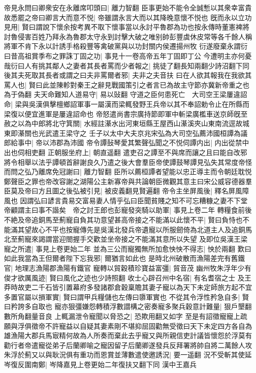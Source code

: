 帝見永問曰卿衆安在永離席叩頭曰|{
	離力智翻}
臣事更始不能令全誠慙以其衆幸富貴故悉罷之帝曰卿言大而意不悦|{
	帝雖謂永言大而以其降晚意懷不悦也}
旣而永以立功見用|{
	賢曰謂說下懷余按考異不取下懷事當以永討平魯郡為功也按永傳時董憲裨將討魯侵害百姓乃拜永為魯郡太守永到討擊大破之唯别帥彭豐虡休皮常等各千餘人稱將軍不肯下永以計誘手格殺豐等禽破黨與以功封關内侯遷揚州牧}
衍遂廢棄永謂衍曰昔高祖賞季布之罪誅丁固之功|{
	事見十一卷高帝五年丁固即丁公}
今遭明主亦何憂哉衍曰人有挑其鄰人之妻者其長者罵而少者報之|{
	挑徒了翻長知兩翻少詩沼翻下同}
後其夫死取其長者或謂之曰夫非罵爾者邪|{
	夫非之夫音扶}
曰在人欲其報我在我欲其罵人也|{
	賢曰此並陳軫對秦王之辭見戰國策引之者言已為故主守節亦冀新帝重之也為于偽翻}
夫天命難知人道易守|{
	易以䜴翻}
守道之臣何患死亡　大司空王梁屢違詔命|{
	梁與吳漢俱擊檀鄉詔軍事一屬漢而梁輒發野王兵帝以其不奉詔勅令止在所縣而梁復以便宜進軍是屢違詔命也}
帝怒遣尚書宗廣持節即軍中斬梁廣檻車送京師旣至赦之以為中郎將北守箕關|{
	水經註濝水出河東垣縣王屋西山濝溪夾山東南流逕故城東即濝關也光武遣王梁守之}
壬子以太中大夫京兆宋弘為大司空弘薦沛國桓譚為議郎給事中|{
	帝以沛郡為沛國}
帝令譚鼔琴愛其繁聲弘聞之不悦伺譚内出|{
	内出從禁中出也伺相吏翻}
正朝服坐府上|{
	朝直遥翻}
遣吏召之譚至不與席而讓之且曰能自改邪將令相舉以法乎譚頓首辭謝良久乃遣之後大會羣臣帝使譚鼓琴譚見弘失其常度帝怪而問之弘乃離席免冠謝曰|{
	離力智翻}
臣所以薦桓譚者望能以忠正導主而令朝廷耽悦鄭聲臣之罪也帝改容謝之湖陽公主新寡帝與共論朝臣微觀其意主曰宋公威容德器羣臣莫及帝曰方且圖之後弘被引見|{
	被皮義翻見賢遍翻}
帝令主坐屏風後|{
	釋名屏風障風也}
因謂弘曰諺言貴易交富易妻人情乎弘曰臣聞貧賤之知不可忘糟糠之妻不下堂帝顧謂主曰事不諧矣　帝之討王郎也彭寵發突騎以助軍|{
	事見上卷二年}
轉糧食前後不絶及帝追銅馬至薊寵自負其功意望甚高帝接之不能滿以此懷不平|{
	賢曰負恃也不能滿其望故心不平也按寵傳先是吳漢北發兵帝遺寵以所服劒倚為北道主人及追銅馬北至薊寵來謁謂當迎閤握手交歡並坐帝接之不能滿其意所以失望}
及即位吳漢王梁寵之所遣|{
	事見上卷更始二年}
並為三公而寵獨無所加愈怏怏不得志|{
	怏於兩翻}
歎曰如此我當為王但爾者陛下忘我邪|{
	爾猶言如此也}
是時北州破散而漁陽差完有舊鐵官|{
	地理志漁陽郡漁陽有鐵官}
寵轉以貿穀積珍寶益富彊|{
	貿音茂}
幽州牧朱浮年少有俊才欲厲風迹|{
	賢曰風化之迹也少詩照翻}
收士心辟召州中名宿|{
	有名耆宿之士}
及王莽時故吏二千石皆引置幕府多發諸郡倉穀稟贍其妻子寵以為天下未定師旅方起不宜多置官屬以損軍實|{
	賢曰謂甲兵糧儲也左傳曰隳軍實也}
不從其令浮性矜急自多|{
	賢曰矜誇多自取也}
寵亦狠彊嫌怨轉積浮數譛構之密奏寵多聚兵穀意計難量|{
	狠戶墾翻數所角翻量音良}
上輒漏泄令寵聞以脅恐之|{
	恐欺用翻又如字}
至是有詔徵寵寵上疏願與浮俱徵帝不許寵益以自疑其妻素剛不堪抑屈固勸無受徵曰天下未定四方各自為雄漁陽大郡兵馬㝡精何故為人所奏而棄此去乎寵又與所親信吏計議皆懷怨於浮莫有勸行者帝遣寵從弟子后蘭卿喻之寵因留子后蘭卿遂發兵反拜署將帥自將二萬餘人攻朱浮於薊又以與耿況俱有重功而恩賞並薄數遣使邀誘況|{
	要一遥翻}
況不受斬其使延岑復反圍南鄭|{
	岑降嘉見上卷更始二年復扶又翻下同}
漢中王嘉兵

